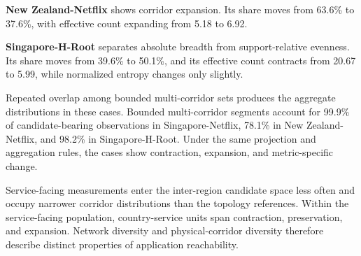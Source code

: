 \textbf{New Zealand-Netflix} shows corridor expansion. Its share moves
from 63.6\% to 37.6\%, with effective count expanding from 5.18 to 6.92.

\textbf{Singapore-H-Root} separates absolute breadth from support-relative
evenness. Its share moves from 39.6\% to 50.1\%, and its effective
count contracts from 20.67 to 5.99, while normalized entropy changes only
slightly.

Repeated overlap among bounded multi-corridor sets produces the aggregate
distributions in these cases. Bounded multi-corridor segments account for
99.9\% of candidate-bearing observations in Singapore-Netflix, 78.1\% in
New Zealand-Netflix, and 98.2\% in Singapore-H-Root. Under the same
projection and aggregation rules, the cases show contraction, expansion,
and metric-specific change.

Service-facing measurements enter the inter-region candidate space less often
and occupy narrower corridor distributions than the topology references.
Within the service-facing population, country-service units span contraction,
preservation, and expansion. Network diversity and physical-corridor diversity
therefore describe distinct properties of application reachability.